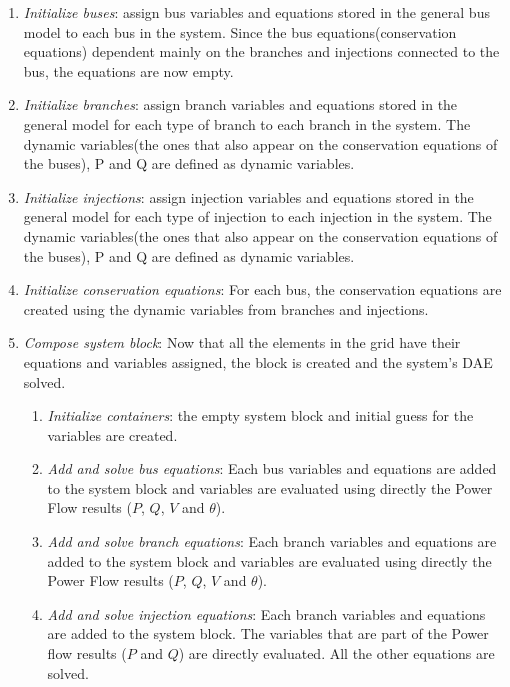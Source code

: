 \begin{enumerate}
  \item \textit{Initialize buses}: assign bus variables and equations stored in the general bus model to each bus in the system. Since the bus equations(conservation equations) dependent
  mainly on the branches and injections connected to the bus, the equations are now empty.
  \item \textit{Initialize branches}: assign branch variables and equations stored in the general model for each type of branch to each branch in the system. The dynamic variables(the ones that also appear
  on the conservation equations of the buses), P and Q are defined as dynamic variables.
  \item \textit{Initialize injections}: assign injection variables and equations stored in the general model for each type of injection to each injection in the system. The dynamic variables(the ones that also appear
  on the conservation equations of the buses), P and Q are defined as dynamic variables.
  \item \textit{Initialize conservation equations}: For each bus, the conservation equations are created using the dynamic variables from branches and injections.
  \item \textit{Compose system block}: Now that all the elements in the grid have their equations and variables assigned, the block is created and the system's DAE solved.
    \begin{enumerate}
    \item \textit{Initialize containers}: the empty system block and initial guess for the variables are created.
    \item \textit{Add and solve bus equations}: Each bus variables and equations are added to the system block and variables are evaluated using directly the Power Flow results ($P$, $Q$, $V$ and $\theta$).
    \item \textit{Add and solve branch equations}: Each branch variables and equations are added to the system block and variables are evaluated using directly the Power Flow results ($P$, $Q$, $V$ and $\theta$).
    \item \textit{Add and solve injection equations}: Each branch variables and equations are added to the system block. The variables that are part of the Power flow results ($P$ and $Q$) are directly evaluated.
    All the other equations are solved.
    \end{enumerate}
\end{enumerate}

